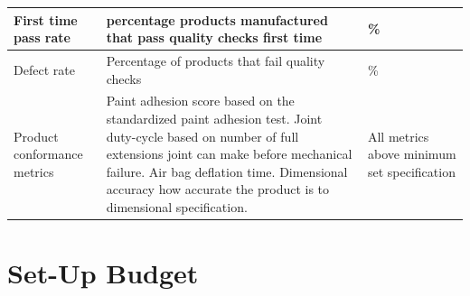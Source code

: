 \documentclass{article}
\begin{document}
\begin{table}[H]
\begin{tabular}{ |p{3cm}|p{10.5cm}|p{4cm}| }
      First time pass rate &
      percentage products manufactured that pass quality checks first time &
      \ge 90\% \\
      \hline
      Defect rate &
      Percentage of products that fail quality checks & 
      \le 5\% \\
      \hline
      Product conformance metrics &
      Paint adhesion score based on the standardized paint adhesion test. Joint
      duty-cycle based on number of full extensions joint can make before
      mechanical failure. Air bag deflation time.
      Dimensional accuracy how accurate the product is to dimensional
      specification. &
      All metrics above minimum set specification \\
      \hline
    \end{tabular}
  \end{table}
  
  \section{Set-Up Budget}
\end{document}
